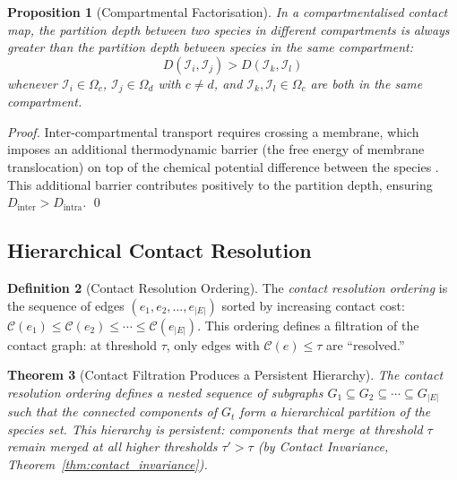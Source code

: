 \documentclass[11pt,twocolumn]{article}
\theoremstyle{plain}
\newtheorem{theorem}{Theorem}[section]
\newtheorem{proposition}[theorem]{Proposition}
\theoremstyle{definition}
\newtheorem{definition}[theorem]{Definition}
\newcommand{\CC}{\mathcal{C}}
\begin{document}
\begin{proposition}[Compartmental Factorisation]
\label{prop:factorisation}
In a compartmentalised contact map, the partition depth between two species in
different compartments is always greater than the partition depth between species
in the same compartment:
\begin{equation}
  D(\mathcal{I}_i, \mathcal{I}_j) > D(\mathcal{I}_k, \mathcal{I}_l)
\end{equation}
whenever $\mathcal{I}_i \in \Omega_c$, $\mathcal{I}_j \in \Omega_d$ with $c
\neq d$, and $\mathcal{I}_k, \mathcal{I}_l \in \Omega_c$ are both in the same
compartment.
\end{proposition}

\begin{proof}
Inter-compartmental transport requires crossing a membrane, which imposes an
additional thermodynamic barrier (the free energy of membrane translocation)
on top of the chemical potential difference between the species
\cite{diekmann2013evolution, zecchin2015metabolic}. This additional barrier
contributes positively to the partition depth, ensuring
$D_{\text{inter}} > D_{\text{intra}}$. \qed
\end{proof}

\subsection{Hierarchical Contact Resolution}

\begin{definition}[Contact Resolution Ordering]
\label{def:resolution_ordering}
The \emph{contact resolution ordering} is the sequence of edges
$(e_1, e_2, \ldots, e_{|E|})$ sorted by increasing contact cost:
$\CC(e_1) \leq \CC(e_2) \leq \cdots \leq \CC(e_{|E|})$. This ordering
defines a filtration of the contact graph: at threshold $\tau$, only edges
with $\CC(e) \leq \tau$ are ``resolved.''
\end{definition}

\begin{theorem}[Contact Filtration Produces a Persistent Hierarchy]
\label{thm:filtration}
The contact resolution ordering defines a nested sequence of subgraphs
$G_1 \subseteq G_2 \subseteq \cdots \subseteq G_{|E|}$ such that the
connected components of $G_t$ form a hierarchical partition of the species set.
This hierarchy is persistent: components that merge at threshold $\tau$ remain
merged at all higher thresholds $\tau' > \tau$ (by Contact Invariance,
Theorem~\ref{thm:contact_invariance}).
\end{theorem}
\end{document}
